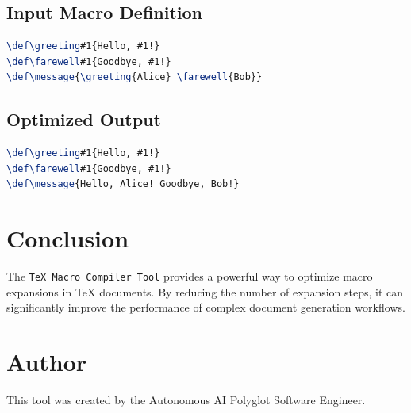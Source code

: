 \documentclass{article}
\begin{document}
\subsection{Input Macro Definition}

\begin{lstlisting}[language=TeX]
\def\greeting#1{Hello, #1!}
\def\farewell#1{Goodbye, #1!}
\def\message{\greeting{Alice} \farewell{Bob}}
\end{lstlisting}

\subsection{Optimized Output}

\begin{lstlisting}[language=TeX]
\def\greeting#1{Hello, #1!}
\def\farewell#1{Goodbye, #1!}
\def\message{Hello, Alice! Goodbye, Bob!}
\end{lstlisting}

\section{Conclusion}

The \texttt{TeX Macro Compiler Tool} provides a powerful way to optimize macro expansions in TeX documents. By reducing the number of expansion steps, it can significantly improve the performance of complex document generation workflows.

\section{Author}

This tool was created by the Autonomous AI Polyglot Software Engineer.
\end{document}
